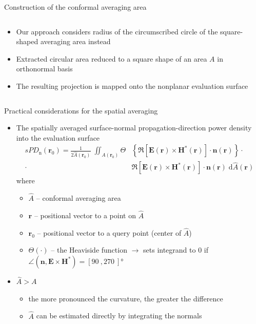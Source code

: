 \documentclass[xcolor=dvipsnames,10pt]{beamer}
\begin{document}
\begin{frame}{Construction of the conformal averaging area}
\begin{columns}[c]
\begin{column}{0.5\textwidth}
\begin{itemize}
\begin{itemize}
                \end{itemize}
                \item<2> Our approach considers radius of the circumscribed circle of the square-shaped averaging area instead
                \item<3> Extracted circular area reduced to a square shape of an area $A$ in orthonormal basis
                \item<4> The resulting projection is mapped onto the nonplanar evaluation surface
            \end{itemize}
        \end{column}
    \end{columns} 
\end{frame}

\begin{frame}{Practical considerations for the spatial averaging}
    \begin{itemize}
        \item The spatially averaged surface-normal propagation-direction power density into the evaluation surface
        \begin{align*}
            sPD_\text{n}(\mathbf{r}_0) = \frac{1}{2 \hat{A}\left( \mathbf{r}_0 \right)} \; \iint_{A \left( \mathbf{r}_0 \right)} \Theta & \left\{ \Re \left[ \mathbf{E \left( r \right)} \times \mathbf{H^* \left( r \right)} \right] \cdot \mathbf{n \left( r \right)} \right\} \cdot \\ \cdot &\Re \left[ \mathbf{E \left( r \right)} \times \mathbf{H^* \left( r \right)} \right] \cdot \mathbf{n \left( r \right)} \; \mathrm{d}\hat{A}\left( \mathbf{r} \right)
        \end{align*}
        where
        \begin{itemize}
            \item $\hat{A}$ -- conformal averaging area
            \item $\mathbf{r}$ -- positional vector to a point on $\hat{A}$
            \item $\mathbf{r}_0$ -- positional vector to a query point (center of $\hat{A}$)
            \item $\Theta(\cdot)$ -- the Heaviside function $\rightarrow$ sets integrand to \num{0} if $\angle{\left(\mathbf{n}, \mathbf{E} \times \mathbf{H}^*\right)} =  \left[ \SI{90}{}, \SI{270}{} \right]°$
        \end{itemize}
        \item $\hat{A} > A$
        \begin{itemize}
            \item the more pronounced the curvature, the greater the difference
            \item $\hat{A}$ can be estimated directly by integrating the normals
        \end{itemize}
    \end{itemize}
\end{frame}
\end{document}
